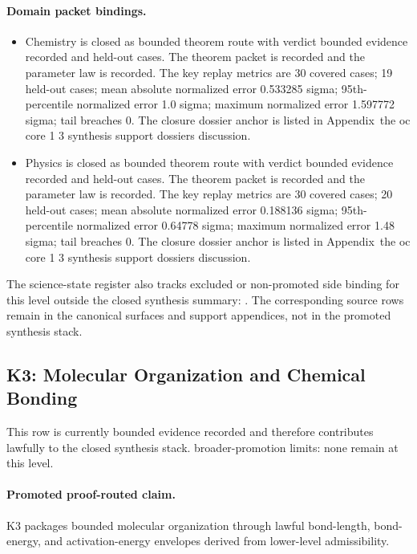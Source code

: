 \paragraph{Domain packet bindings.}
\begin{itemize}[leftmargin=1.6em,nosep]
\item Chemistry is closed as bounded theorem route with verdict bounded evidence recorded and  held-out cases. The theorem packet is recorded and the parameter law is recorded. The key replay metrics are 30 covered cases; 19 held-out cases; mean absolute normalized error 0.533285 sigma; 95th-percentile normalized error 1.0 sigma; maximum normalized error 1.597772 sigma; tail breaches 0. The closure dossier anchor is listed in Appendix~the oc core 1 3 synthesis support dossiers discussion.
\item Physics is closed as bounded theorem route with verdict bounded evidence recorded and  held-out cases. The theorem packet is recorded and the parameter law is recorded. The key replay metrics are 30 covered cases; 20 held-out cases; mean absolute normalized error 0.188136 sigma; 95th-percentile normalized error 0.64778 sigma; maximum normalized error 1.48 sigma; tail breaches 0. The closure dossier anchor is listed in Appendix~the oc core 1 3 synthesis support dossiers discussion.
\end{itemize}
The science-state register also tracks  excluded or non-promoted side binding for this level outside the closed synthesis summary: . The corresponding source rows remain in the canonical surfaces and support appendices, not in the promoted synthesis stack.

\subsection{K3: Molecular Organization and Chemical Bonding}
\label{sec:oc-core-1-3-synthesis-k3}
This row is currently bounded evidence recorded and therefore contributes lawfully to the closed synthesis stack.
broader-promotion limits: none remain at this level.

\paragraph{Promoted proof-routed claim.}
K3 packages bounded molecular organization through lawful bond-length, bond-energy, and activation-energy envelopes derived from lower-level admissibility.

